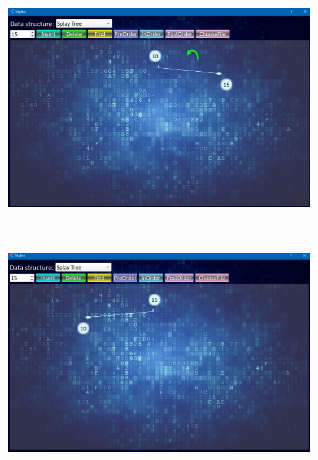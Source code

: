 \documentclass{article}%
\begin{document}
\begin{figure}[htbp]
	\centering
	\includegraphics[height=6.0cm,width=8.0cm]{./image/2.png}
\end{figure}

\begin{figure}[htbp]
	\centering
	\includegraphics[height=6.0cm,width=8.0cm]{./image/3.png}
\end{figure}
\end{document}
